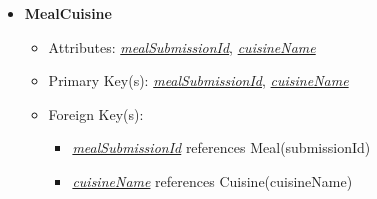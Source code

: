 \documentclass{article}
\begin{document}
\begin{itemize}
        \item \textbf{MealCuisine}
        \begin{itemize}
            \item Attributes: \underline{\textit{mealSubmissionId}}, \underline{\textit{cuisineName}}
            \item Primary Key(s): \underline{\textit{mealSubmissionId}}, \underline{\textit{cuisineName}}
            \item Foreign Key(s): 
                \begin{itemize}
                    \item \underline{\textit{mealSubmissionId}} references Meal(submissionId)
                    \item \underline{\textit{cuisineName}} references Cuisine(cuisineName)
                \end{itemize}   
        \end{itemize}
    \end{itemize}
\end{document}
